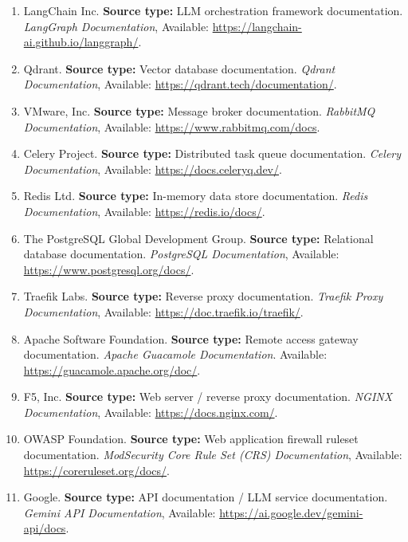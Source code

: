 \begin{enumerate}
\item
LangChain Inc.
\textbf{Source type:} LLM orchestration framework documentation.
\textit{LangGraph Documentation},
Available: \url{https://langchain-ai.github.io/langgraph/}.

\item
Qdrant.
\textbf{Source type:} Vector database documentation.
\textit{Qdrant Documentation},
Available: \url{https://qdrant.tech/documentation/}.

\item
VMware, Inc.
\textbf{Source type:} Message broker documentation.
\textit{RabbitMQ Documentation},
Available: \url{https://www.rabbitmq.com/docs}.

\item
Celery Project.
\textbf{Source type:} Distributed task queue documentation.
\textit{Celery Documentation},
Available: \url{https://docs.celeryq.dev/}.

\item
Redis Ltd.
\textbf{Source type:} In-memory data store documentation.
\textit{Redis Documentation},
Available: \url{https://redis.io/docs/}.

\item
The PostgreSQL Global Development Group.
\textbf{Source type:} Relational database documentation.
\textit{PostgreSQL Documentation},
Available: \url{https://www.postgresql.org/docs/}.

\item
Traefik Labs.
\textbf{Source type:} Reverse proxy documentation.
\textit{Traefik Proxy Documentation},
Available: \url{https://doc.traefik.io/traefik/}.

\item
Apache Software Foundation.
\textbf{Source type:} Remote access gateway documentation.
\textit{Apache Guacamole Documentation}.
Available: \url{https://guacamole.apache.org/doc/}.

\item
F5, Inc.
\textbf{Source type:} Web server / reverse proxy documentation.
\textit{NGINX Documentation},
Available: \url{https://docs.nginx.com/}.

\item
OWASP Foundation.
\textbf{Source type:} Web application firewall ruleset documentation.
\textit{ModSecurity Core Rule Set (CRS) Documentation},
Available: \url{https://coreruleset.org/docs/}.

\item
Google.
\textbf{Source type:} API documentation / LLM service documentation.
\textit{Gemini API Documentation},
Available: \url{https://ai.google.dev/gemini-api/docs}.

\end{enumerate}